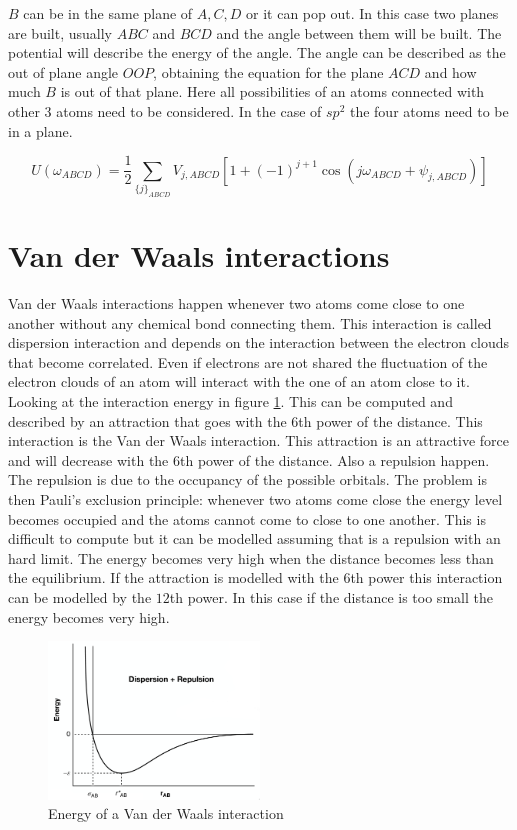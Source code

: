 	$B$ can be in the same plane of $A, C, D$ or it can pop out.
	In this case two planes are built, usually $ABC$ and $BCD$ and the angle between them will be built.
	The potential will describe the energy of the angle.
	The angle can be described as the out of plane angle $OOP$, obtaining the equation for the plane $ACD$ and how much $B$ is out of that plane.
	Here all possibilities of an atoms connected with other $3$ atoms need to be considered.
	In the case of $sp^2$ the four atoms need to be in a plane.

	$$U(\omega_{ABCD}) = \frac{1}{2}\sum\limits_{\{j\}_{ABCD}}V_{j,ABCD}[1+(-1)^{j+1}\cos(j\omega_{ABCD}+\psi_{j,ABCD})]$$

\section{Van der Waals interactions}
Van der Waals interactions happen whenever two atoms come close to one another without any chemical bond connecting them.
This interaction is called dispersion interaction and depends on the interaction between the electron clouds that become correlated.
Even if electrons are not shared the fluctuation of the electron clouds of an atom will interact with the one of an atom close to it.
Looking at the interaction energy in figure \ref{fig:van-der-waals}.
This can be computed and described by an attraction that goes with the $6$th power of the distance.
This interaction is the Van der Waals interaction.
This attraction is an attractive force and will decrease with the $6$th power of the distance.
Also a repulsion happen.
The repulsion is due to the occupancy of the possible orbitals.
The problem is then Pauli's exclusion principle: whenever two atoms come close the energy level becomes occupied and the atoms cannot come to close to one another.
This is difficult to compute but it can be modelled assuming that is a repulsion with an hard limit.
The energy becomes very high when the distance becomes less than the equilibrium.
If the attraction is modelled with the $6$th power this interaction can be modelled by the $12$th power.
In this case if the distance is too small the energy becomes very high.

\begin{figure}[H]
	\centering
	\includegraphics[width=0.5\textwidth]{van-der-waals}
	\caption{Energy of a Van der Waals interaction}
	\label{fig:van-der-waals}
\end{figure}

